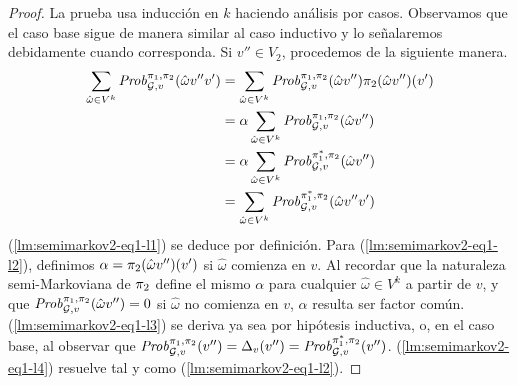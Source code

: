 \begin{proof}
  La prueba usa inducción en $k$ haciendo análisis por casos. Observamos que
  el caso base sigue de manera similar al caso inductivo y lo señalaremos debidamente cuando corresponda.
  Si $v'' \in V_2$, procedemos de la siguiente manera.
  \begin{align}	
    \label{lm:semimarkov2-eq1-l1}
    \sum_{\hat{\omega} \in V^k}\mathit{Prob}^{\pi_{1}, \pi_{2}}_{\mathcal{G},v}(\hat{\omega}v''v')
    & = \sum_{\hat{\omega} \in V^k}\mathit{Prob}^{\pi_{1}, \pi_{2}}_{\mathcal{G},v}(\hat{\omega}v'') \pi_{2}(\hat{\omega}v'')(v')\\
    \label{lm:semimarkov2-eq1-l2}
    & = \alpha \sum_{\hat{\omega} \in V^k}\mathit{Prob}^{\pi_{1}, \pi_{2}}_{\mathcal{G},v}(\hat{\omega}v'') \\
    \label{lm:semimarkov2-eq1-l3}
    & = \alpha \sum_{\hat{\omega} \in V^k}\mathit{Prob}^{\pi^*_{1}, \pi_{2}}_{\mathcal{G},v}(\hat{\omega}v'') \\
    \label{lm:semimarkov2-eq1-l4}
    & = \sum_{\hat{\omega} \in V^k}\mathit{Prob}^{\pi^*_{1}, \pi_{2}}_{\mathcal{G},v}(\hat{\omega}v''v')
  \end{align}
  (\ref{lm:semimarkov2-eq1-l1}) se deduce por definición.
  Para (\ref{lm:semimarkov2-eq1-l2}), definimos $\alpha =
  \pi_{2}(\hat{\omega}v'')(v')$ si $\hat{\omega}$ comienza en $v$. Al recordar que la naturaleza semi-Markoviana de $\pi_{2}$ define el
  mismo $\alpha$ para cualquier $\hat{\omega}\in V^k$ a partir de $v$, y que
  $\mathit{Prob}^{\pi_{1}, \pi_{2}}_{\mathcal{G},v}(\hat{\omega}v'') = 0$ si
  $\hat{\omega}$ no comienza en $v$, $\alpha$ resulta ser factor común.
  (\ref{lm:semimarkov2-eq1-l3}) se deriva ya sea por hipótesis inductiva, o, en el caso base, al observar que
  $\mathit{Prob}^{\pi_{1}, \pi_{2}}_{\mathcal{G},v}(v'') =
  \Delta_v(v'')=\mathit{Prob}^{\pi^*_{1}, \pi_{2}}_{\mathcal{G},v}(v'')$.
  (\ref{lm:semimarkov2-eq1-l4}) resuelve tal y como
  (\ref{lm:semimarkov2-eq1-l2}).


\end{proof}
